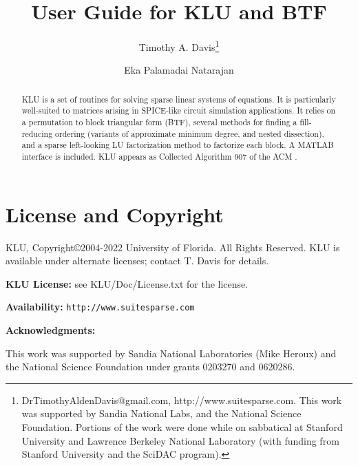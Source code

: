 \documentclass[11pt]{article}
\begin{document}

\title{User Guide for KLU and BTF}
\author{
Timothy A. Davis\thanks{
DrTimothyAldenDavis@gmail.com,
http://www.suitesparse.com.
This work was supported by Sandia National Labs, and the National
Science Foundation.
Portions of the work were done while on sabbatical at Stanford University
and Lawrence Berkeley National Laboratory (with funding from Stanford
University and the SciDAC program).
}
\and Eka Palamadai Natarajan}


\maketitle

\begin{abstract}
KLU is a set of routines for solving sparse linear systems of equations.
It is particularly well-suited to matrices arising in SPICE-like circuit
simulation applications.
It relies on a permutation to block triangular form (BTF), several methods
for finding a fill-reducing ordering (variants of approximate minimum degree,
and nested dissection), and a sparse left-looking LU factorization method
to factorize each block.  A MATLAB interface is included.
KLU appears as Collected Algorithm 907 of the ACM \cite{DavisNatarajan10}.
\end{abstract}

\newpage
\tableofcontents
\newpage

\section{License and Copyright}

KLU, Copyright\copyright 2004-2022 University of Florida.
All Rights Reserved.
KLU is available under alternate licenses; contact T. Davis for details.

{\bf KLU License:} see KLU/Doc/License.txt for the license.

{\bf Availability:} {\tt http://www.suitesparse.com}

{\bf Acknowledgments:}

    This work was supported by Sandia National Laboratories (Mike Heroux)
    and the National Science Foundation under grants 0203270 and 0620286.
\end{document}
